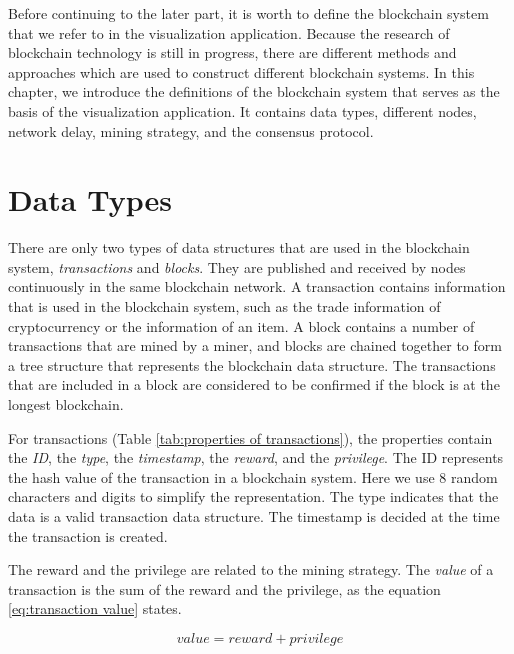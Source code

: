 Before continuing to the later part, it is worth to define the blockchain system that we refer to in the visualization application. Because the research of blockchain technology is still in progress, there are different methods and approaches which are used to construct different blockchain systems. In this chapter, we introduce the definitions of the blockchain system that serves as the basis of the visualization application. It contains data types, different nodes, network delay, mining strategy, and the consensus protocol.

\section{Data Types}

There are only two types of data structures that are used in the blockchain system, \textit{transactions} and \textit{blocks}. They are published and received by nodes continuously in the same blockchain network. A transaction contains information that is used in the blockchain system, such as the trade information of cryptocurrency or the information of an item. A block contains a number of transactions that are mined by a miner, and blocks are chained together to form a tree structure that represents the blockchain data structure. The transactions that are included in a block are considered to be confirmed if the block is at the longest blockchain.

For transactions (Table \ref{tab:properties of transactions}), the properties contain the \textit{ID}, the \textit{type}, the \textit{timestamp}, the \textit{reward}, and the \textit{privilege}. The ID represents the hash value of the transaction in a blockchain system. Here we use 8 random characters and digits to simplify the representation. The type indicates that the data is a valid transaction data structure. The timestamp is decided at the time the transaction is created. 

The reward and the privilege are related to the mining strategy. The \textit{value} of a transaction is the sum of the reward and the privilege, as the equation \ref{eq:transaction value} states.

\begin{equation} \label{eq:transaction value}
    value = reward + privilege
\end{equation}

\clearpage


